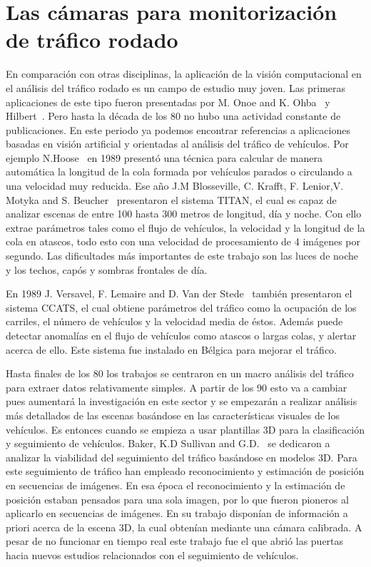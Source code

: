 \section{Las cámaras para monitorización de tráfico rodado}

En comparación con otras disciplinas, la aplicación de la visión computacional en el análisis del tráfico rodado es un campo de estudio muy joven. Las primeras aplicaciones de este tipo fueron presentadas por M. Onoe and K. Ohba~\cite{digital_analisis} y Hilbert~\cite{wide_area}. Pero hasta la década de los 80 no hubo una actividad constante de publicaciones. En este periodo ya podemos encontrar referencias a aplicaciones basadas en visión artificial y orientadas al análisis del tráfico de vehículos. Por ejemplo N.Hoose~\cite{queue_detection} en 1989 presentó una técnica para calcular de manera automática la longitud de la cola formada por vehículos parados o circulando a una velocidad muy reducida. Ese año J.M Blosseville, C. Krafft, F. Lenior,V. Motyka and S. Beucher~\cite{traffic_measurement} presentaron el sistema TITAN, el cual es capaz de analizar escenas de entre 100 hasta 300 metros de longitud, día y noche. Con ello extrae parámetros tales como el flujo de vehículos, la velocidad y la longitud de la cola en atascos, todo esto con una velocidad de procesamiento de 4 imágenes por segundo. Las dificultades más importantes de este trabajo son las luces de noche y los techos, capós y sombras frontales de día. 

En 1989 J. Versavel, F. Lemaire and D. Van der Stede~\cite{computer_aided} también presentaron el sistema CCATS, el cual obtiene parámetros del tráfico como la ocupación de los carriles, el número de vehículos y la velocidad media de éstos. Además puede detectar anomalías en el flujo de vehículos como atascos o largas colas, y alertar acerca de ello. Este sistema fue instalado en Bélgica para mejorar el tráfico.

Hasta finales de los 80 los trabajos se centraron en un macro análisis del tráfico para extraer datos relativamente simples. A partir de los 90 esto va a cambiar pues aumentará la investigación en este sector y se empezarán a realizar análisis más detallados de las escenas basándose en las características visuales de los vehículos. Es entonces cuando se empieza a usar plantillas 3D para la clasificación y seguimiento de vehículos. Baker, K.D Sullivan and G.D.~\cite{performance_assessment} se dedicaron a analizar la viabilidad del seguimiento del tráfico basándose en modelos 3D. Para este seguimiento de tráfico han empleado reconocimiento y estimación de posición en secuencias de imágenes. En esa época el reconocimiento y la estimación de posición estaban pensados para una sola imagen, por lo que fueron pioneros al aplicarlo en secuencias de imágenes. En su trabajo disponían de información a priori acerca de la escena 3D, la cual obtenían mediante una cámara calibrada. A pesar de no funcionar en tiempo real este trabajo fue el que abrió las puertas hacia nuevos estudios relacionados con el seguimiento de vehículos.

